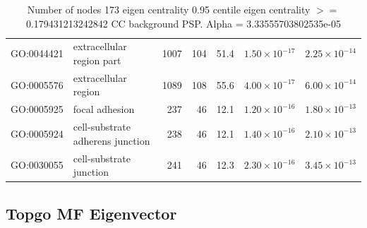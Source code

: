 \begin{table}[ht]
\begin{adjustbox}{max width=\textwidth}
\begin{tabular}{llrrrrr}
  GO:0044421 & extracellular region part & 1007 & 104 & 51.4 & $1.50 \times 10^{-17}$ & $2.25 \times 10^{-14}$ \\ 
  GO:0005576 & extracellular region & 1089 & 108 & 55.6 & $4.00 \times 10^{-17}$ & $6.00 \times 10^{-14}$ \\ 
  GO:0005925 & focal adhesion & 237 & 46 & 12.1 & $1.20 \times 10^{-16}$ & $1.80 \times 10^{-13}$ \\ 
  GO:0005924 & cell-substrate adherens junction & 238 & 46 & 12.1 & $1.40 \times 10^{-16}$ & $2.10 \times 10^{-13}$ \\ 
  GO:0030055 & cell-substrate junction & 241 & 46 & 12.3 & $2.30 \times 10^{-16}$ & $3.45 \times 10^{-13}$ \\ 
   \hline
\end{tabular}
\end{adjustbox}
\caption{Number of nodes 173 eigen centrality 0.95 centile  eigen centrality $>=$ 0.179431213242842 CC background PSP. Alpha = 3.33555703802535e-05} 
\label{tab:Number of nodes 173 eigen centrality 0.95 centile  eigen centrality $>=$ 0.179431213242842 CC background PSP. Alpha = 3.33555703802535e-05}
\end{table}

\subsection{Topgo MF Eigenvector}

